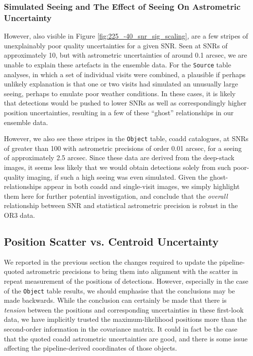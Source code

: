 \documentclass[SE,lsstdraft,authoryear,toc]{lsstdoc}
\begin{document}
\subsubsection{Simulated Seeing and The Effect of Seeing On Astrometric Uncertainty}
However, also visible in Figure \ref{fig:225_-40_snr_sig_scaling}, are a few stripes of unexplainably poor quality uncertainties for a given SNR.
Seen at SNRs of approximately 10, but with astrometric uncertainties of around 0.1 arcsec, we are unable to explain these artefacts in the ensemble data.
For the \texttt{Source} table analyses, in which a set of individual visits were combined, a plausible if perhaps unlikely explanation is that one or two visits had simulated an unusually large seeing, perhaps to emulate poor weather conditions.
In these cases, it is likely that detections would be pushed to lower SNRs as well as correspondingly higher position uncertainties, resulting in a few of these ``ghost'' relationships in our ensemble data.

However, we also see these stripes in the \texttt{Object} table, coadd catalogues, at SNRs of greater than 100 with astrometric precisions of order 0.01 arcsec, for a seeing of approximately 2.5 arcsec.
Since these data are derived from the deep-stack images, it seems less likely that we would obtain detections solely from such poor-quality imaging, if such a high seeing was even simulated.
Given the ghost-relationships appear in both coadd and single-visit images, we simply highlight them here for further potential investigation, and conclude that the \textit{overall} relationship between SNR and statistical astrometric precision is robust in the OR3 data.

\subsection{Position Scatter vs. Centroid Uncertainty}
We reported in the previous section the changes required to update the pipeline-quoted astrometric precisions to bring them into alignment with the scatter in repeat measurement of the positions of detections.
However, especially in the case of the \texttt{Object} table results, we should emphasise that the conclusions may be made backwards.
While the conclusion can certainly be made that there is \textit{tension} between the positions and corresponding uncertainties in these first-look data, we have implicitly trusted the maximum-likelihood positions more than the second-order information in the covariance matrix.
It could in fact be the case that the quoted coadd astrometric uncertainties are good, and there is some issue affecting the pipeline-derived coordinates of those objects.
\end{document}
